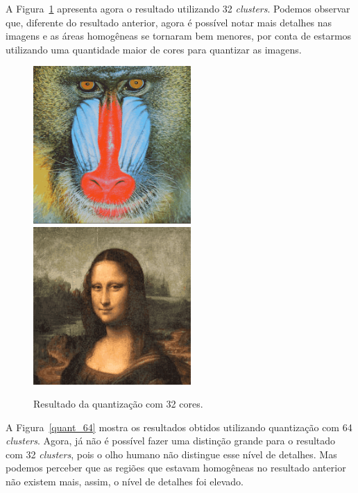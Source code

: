 \documentclass[twoside,twocolumn]{article}
\begin{document}
A Figura~\ref{quant_32} apresenta agora o resultado utilizando 32 \textit{clusters}. Podemos observar que, diferente do resultado anterior, agora é possível notar mais detalhes nas imagens e as áreas homogêneas se tornaram bem menores, por conta de estarmos utilizando uma quantidade maior de cores para quantizar as imagens.

\begin{figure}[h]
\begin{center}
	\includegraphics[height=6cm]{figures/baboon_32.png} \quad
	\includegraphics[height=6cm]{figures/monalisa_32.png}
\caption{Resultado da quantização com 32 cores.} \label{quant_32}
\end{center}
\end{figure}

A Figura~\ref{quant_64} mostra os resultados obtidos utilizando quantização com 64 \textit{clusters}. Agora, já não é possível fazer uma distinção grande para o resultado com 32 \textit{clusters}, pois o olho humano não distingue esse nível de detalhes. Mas podemos perceber que as regiões que estavam homogêneas no resultado anterior não existem mais, assim, o nível de detalhes foi elevado.
\end{document}
